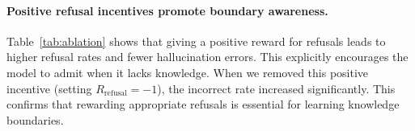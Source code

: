 \paragraph{Positive refusal incentives promote boundary awareness.} Table~\ref{tab:ablation} shows that giving a positive reward for refusals leads to higher refusal rates and fewer hallucination errors. 
This explicitly encourages the model to admit when it lacks knowledge.
When we removed this positive incentive (setting $R_{\text{refusal}}=-1$), the incorrect rate increased significantly.
This confirms that rewarding appropriate refusals is essential for learning knowledge boundaries.





